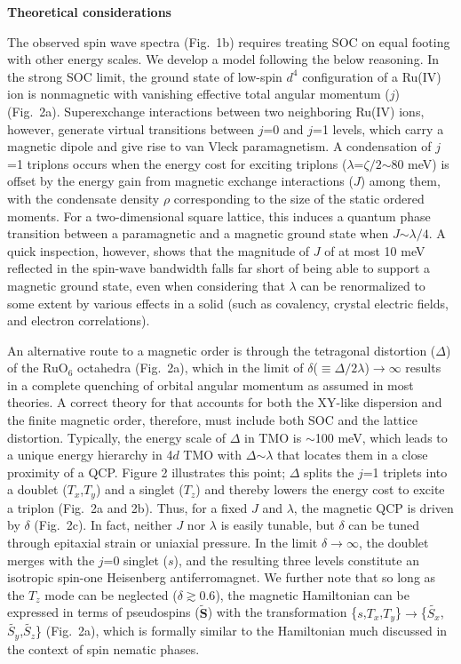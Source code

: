 \vspace{ 10 pt}
\noindent
{\bf Theoretical considerations}

\noindent
The observed spin wave spectra (Fig.~1b) requires treating SOC on equal footing with other energy scales. We develop a model following the below reasoning. In the strong SOC limit, the ground state of low-spin $d^4$ configuration of a Ru(IV) ion is nonmagnetic with vanishing effective total angular momentum ($j$) (Fig.~2a). Superexchange interactions between two neighboring Ru(IV) ions, however, generate virtual transitions between $j$=0 and $j$=1 levels, which carry a magnetic dipole and give rise to van Vleck paramagnetism. A condensation of $j$=1 triplons occurs when the energy cost for exciting triplons ($\lambda$=$\zeta/2$$\sim$80 meV) is offset by the energy gain from magnetic exchange interactions ($J$) among them, with the condensate density $\rho$ corresponding to the size of the static ordered moments. For a two-dimensional square lattice, this induces a quantum phase transition between a paramagnetic and a magnetic ground state when $J$$\sim$$\lambda/4$. A quick inspection, however, shows that the magnitude of $J$ of at most 10 meV reflected in the spin-wave bandwidth falls far short of being able to support a magnetic ground state, even when considering that $\lambda$ can be renormalized to some extent by various effects in a solid (such as covalency, crystal electric fields, and electron correlations). 

An alternative route to a magnetic order is through the tetragonal distortion ($\Delta$) of the RuO$_6$ octahedra (Fig.~2a), which in the limit of $\delta$($\equiv$$\Delta/2\lambda$)$\rightarrow$$\infty$ results in a complete quenching of orbital angular momentum as assumed in most theories. A correct theory for \CRO that accounts for both the XY-like dispersion and the finite magnetic order, therefore, must include both SOC and the lattice distortion. 
Typically, the energy scale of $\Delta$ in TMO is $\sim$100 meV, which leads to a unique energy hierarchy in 4$d$ TMO with $\Delta$$\sim$$\lambda$ that locates them in a close proximity of a QCP. Figure 2 illustrates this point; $\Delta$ splits the $j$=1 triplets into a doublet ($T_x$,$T_y$) and a singlet ($T_z$) and thereby lowers the energy cost to excite a triplon (Fig.~2a and 2b). Thus, for a fixed $J$ and $\lambda$, the magnetic QCP is driven by $\delta$ (Fig.~2c). In fact, neither $J$ nor $\lambda$ is easily tunable, but $\delta$ can be tuned through epitaxial strain or uniaxial pressure. In the limit $\delta$$\rightarrow$$\infty$, the doublet merges with the $j$=0 singlet ($s$), and the resulting three levels constitute an isotropic spin-one Heisenberg antiferromagnet. We further note that so long as the $T_z$ mode can be neglected ($\delta\gtrsim0.6$), the magnetic Hamiltonian can be expressed in terms of pseudospins ($\tilde{\mathbf{S}}$) with the transformation \{$s$,$T_x$,$T_y$\}$\rightarrow$\{$\tilde{S_x}$,$\tilde{S_y}$,$\tilde{S_z}$\} (Fig.~2a), which is formally similar to the Hamiltonian much discussed in the context of spin nematic phases. %
  
